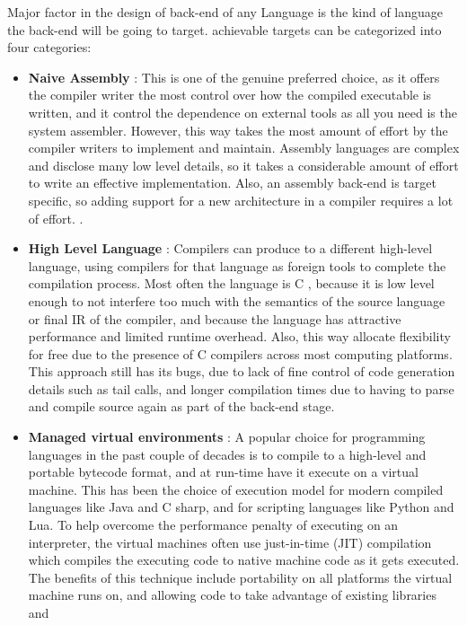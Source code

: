 \documentclass{book}
\begin{document}
	Major factor in the design of back-end of any Language is the kind of language the back-end will be going to target.
	achievable targets can be categorized into four categories:
	
	\begin{itemize}
		\item \textbf{Naive Assembly} :  This is one of the genuine preferred choice, as it offers the compiler
		writer the most control over how the compiled executable is written, and it control
		the dependence on external tools as all you need is the system assembler. However, this
		way takes the most amount of effort by the compiler writers to implement and
		maintain.  Assembly languages are complex and disclose many low level details, so
		it takes a considerable amount of effort to write an effective implementation.  Also,
		an assembly back-end is target specific, so adding support for a new architecture in a
		compiler requires a lot of effort.
		.
		\item \textbf{High Level Language} : Compilers can produce to a different high-level language, using
		compilers for that language as foreign tools to complete the compilation process.
		Most often the language is C ,  because it is low level enough to not interfere
		too much with the semantics of the source language or final IR of the compiler, and
		because the language has attractive performance and limited runtime overhead.  Also,
		this way allocate flexibility for free due to the presence of C compilers across most
		computing platforms. This approach still has its bugs, due to lack of fine control of
		code generation details such as tail calls, and longer compilation times due to having
		to parse and compile source again as part of the back-end stage. 
		\item \textbf{Managed virtual environments} : A popular choice for programming languages in the
		past couple of decades is to compile to a high-level and portable
		bytecode format, and at run-time have it execute on a virtual machine. This has been
		the choice of execution model for modern compiled languages like Java and C sharp, and
		for  scripting  languages  like  Python  and  Lua.   To  help  overcome  the  performance
		penalty of executing on an interpreter,  the virtual machines often use just-in-time
		(JIT) compilation which compiles the executing code to native machine code as it
		gets executed. The benefits of this technique include portability on all platforms the
		virtual machine runs on, and allowing code to take advantage of existing libraries and

\end{itemize}
\end{document}
